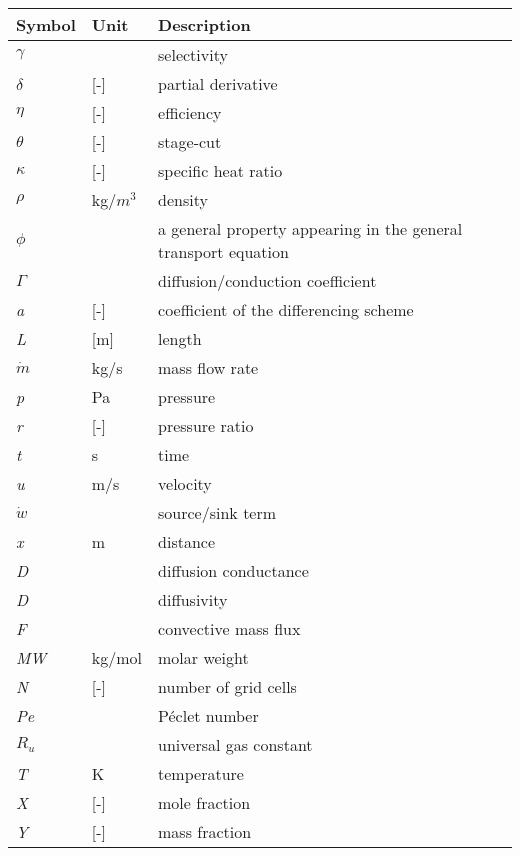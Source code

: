 \begin{table}[H]
	\label{tab:symbols} 
	\begin{tabular}{|l|l|l|}
		\hline
	    \textbf{Symbol} & \textbf{Unit} & \textbf{Description}  \\ \hline
		$\gamma$ 		& 				& selectivity 			\\ \hline
		$\delta$ 		&	[-]			& partial derivative 	\\ \hline
		$\eta$ 			&	[-]			& efficiency 			\\ \hline 
		$\theta$ 		&	[-]			& stage-cut 			\\ \hline 
		$\kappa$ 		& 	[-]			& specific heat ratio 	\\ \hline
		$\rho$ 			& 	kg/$m^3$	& density				\\ \hline
		$\phi$ 			&				& a general property appearing in the general transport equation 								\\ \hline
		$\Gamma$ 		&				& diffusion/conduction coefficient    											\\ \hline 
		\textit{a} 		&	[-]			& coefficient of the differencing scheme													\\ \hline 
		\textit{L} 		&	[m]			& length 				\\ \hline 
		$\dot{m}$  		&	kg/s		& mass flow rate 		\\ \hline 
		\textit{p} 		&	Pa			& pressure				\\ \hline
		\textit{r} 		&	[-]			& pressure ratio		\\ \hline
		\textit{t} 		&	s			& time 					\\ \hline 
		\textit{u} 		&	m/s			& velocity 				\\ \hline
		$\dot{w}$ 		&				& source/sink term 		\\ \hline
		\textit{x} 		&	m			& distance 				\\ \hline 
		\textit{D} 		&				& diffusion conductance \\ \hline 
		\textit{D} 		&				& diffusivity 			\\ \hline 
		\textit{F} 		&				& convective mass flux  \\ \hline 
		\textit{MW} 	&	kg/mol			& molar weight 			\\ \hline 
		\textit{N}  	&	[-]			& number of grid cells  \\ \hline 
		\textit{Pe} 	&				& P\'eclet number 		\\ \hline 
		$R_u$			&				& universal gas constant\\ \hline 
		\textit{T} 		&	K			& temperature 			\\ \hline 
		\textit{X} 		&	[-]			& mole fraction 		\\ \hline 
		\textit{Y} 		&	[-]			& mass fraction 		\\ \hline 
	\end{tabular}
\end{table}

